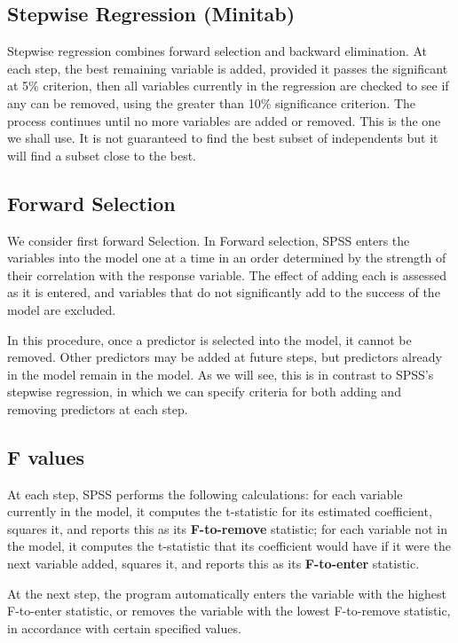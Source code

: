 \documentclass[a4paper,12pt]{article}
\begin{document}
\subsection{Stepwise Regression (Minitab)}
Stepwise regression combines forward selection and backward elimination. At each
step, the best remaining variable is added, provided it passes the significant at 5\%
criterion, then all variables currently in the regression are checked to see if any can be
removed, using the greater than 10\% significance criterion. The process continues
until no more variables are added or removed. This is the one we shall use. It is not
guaranteed to find the best subset of independents but it will find a subset close to the
best.


\subsection{Forward Selection}
We consider first forward Selection. In Forward selection, SPSS enters the variables into the model one at a time in an
order determined by the strength of their correlation with the response variable. The effect of adding each is assessed as it is entered, and variables that do not significantly add to the success of the model are excluded.

In this procedure, once a predictor is selected into the model, it cannot be removed. Other predictors may be added at future steps, but predictors already in the model remain in the model. As we will see, this is in contrast to SPSS's stepwise regression, in which we can specify criteria for both adding and removing predictors at each step.






\subsection{F values}

At each step, SPSS performs the following calculations: for each variable currently in the model, it computes the t-statistic for its estimated coefficient, squares it, and reports this as its \textbf{F-to-remove} statistic; for each variable not in the model, it computes the t-statistic that its coefficient would have if it were the next variable added, squares it, and reports this as its \textbf{F-to-enter} statistic.

At the next step, the program automatically enters the variable with the highest F-to-enter statistic, or removes the variable with the lowest F-to-remove statistic, in accordance with certain specified values. 
\end{document}
